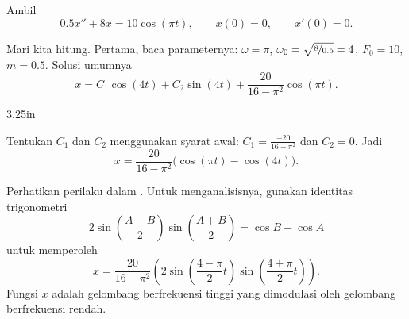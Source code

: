 \begin{example}
Ambil
\begin{equation*}
0.5 x'' + 8 x = 10 \cos (\pi t), \qquad x(0)=0, \qquad x'(0)=0 .
\end{equation*}

Mari kita hitung. Pertama, baca parameternya: $\omega = \pi$, $\omega_0 = \sqrt{\nicefrac{8}{0.5}} = 4$, $F_0 = 10$, $m=0.5$. Solusi umumnya
\begin{equation*}
x = C_1 \cos (4 t) + C_2 \sin (4 t) +
\frac{20}{16 - \pi^2} \cos (\pi t) .
\end{equation*}

\begin{mywrapfig}[15]{3.25in}
\capstart
{}
\caption{Grafik
$\frac{20}{16 - \pi^2} \bigl( \cos (\pi t)- \cos (4 t) \bigr)$.\label{3.6:beatingfig}}
\end{mywrapfig}
%
%

Tentukan $C_1$ dan $C_2$ menggunakan syarat awal: $C_1 = \frac{-20}{16 - \pi^2}$ dan $C_2 = 0$. Jadi
\begin{equation*}
x =
\frac{20}{16 - \pi^2} \bigl( \cos (\pi t)- \cos (4 t) \bigr) .
\end{equation*}


Perhatikan perilaku  dalam . Untuk menganalisisnya, gunakan identitas trigonometri
\begin{equation*}
2\sin \left( \frac{A-B}{2} \right) \sin \left( \frac{A+B}{2} \right) =
\cos B -\cos A
\end{equation*}
untuk memperoleh
\begin{equation*}
x =
\frac{20}{16 - \pi^2} \left( 2 \sin \left(\frac{4-\pi}{2} t \right)
\sin \left( \frac{4+\pi}{2} t \right) \right) .
\end{equation*}
Fungsi $x$ adalah gelombang berfrekuensi tinggi yang dimodulasi oleh gelombang berfrekuensi rendah.
\end{example}

